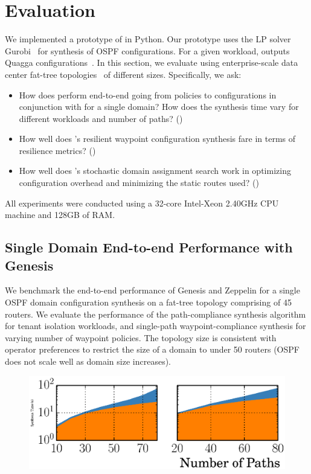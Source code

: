 \section{Evaluation}
 \label{sec:evaluation}
 
 We implemented a prototype of \name in Python. Our prototype uses the
 LP solver Gurobi~\cite{gurobi} for synthesis of OSPF configurations.
 For a given workload, \name outputs Quagga configurations~\cite{quagga}.  In this section, we evaluate \Name using
enterprise-scale data
center fat-tree topologies~\cite{fattree} of different 
sizes. 
Specifically, we ask:
\begin{itemize}
	\item How does \name perform end-to-end going from policies to
	configurations in conjunction with \genesis for a single domain? 
	How does the synthesis time vary for different workloads and number 
	of paths? ()
	
	\item How well does \name's resilient waypoint configuration 
	synthesis fare in terms of resilience metrics? ()
	
	\item How well does \name's stochastic domain assignment 
	search work in optimizing configuration overhead
	and minimizing the static routes used? ()
\end{itemize}
All experiments were conducted using a
32-core Intel-Xeon 2.40GHz CPU machine and
128GB of RAM.

\subsection{Single Domain End-to-end Performance with Genesis}\label{sec:ospfeval}
We benchmark the end-to-end performance of Genesis and Zeppelin
for a single OSPF domain configuration  synthesis on a fat-tree 
topology comprising of 45 routers. We evaluate the performance
of the path-compliance synthesis algorithm for tenant 
isolation workloads, and single-path waypoint-compliance 
synthesis for varying number of waypoint policies.
The topology size is consistent with operator preferences to restrict
the size of a domain to under 50 routers (OSPF does not scale
well as domain size increases).

\begin{figure}
	\includegraphics[width=0.58\columnwidth]{figures/ospfisolation.eps}
\end{figure}

